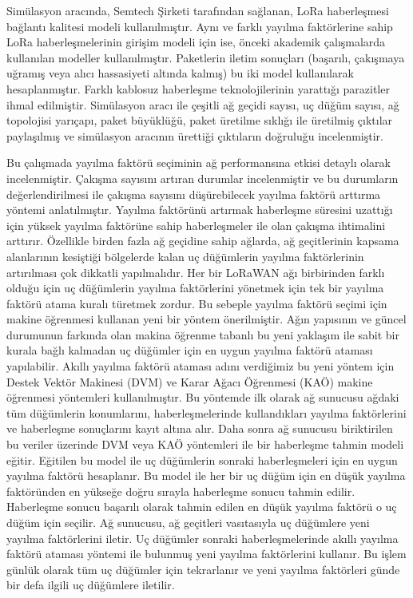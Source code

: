 Simülasyon aracında, Semtech Şirketi tarafından sağlanan, LoRa haberleşmesi bağlantı kalitesi modeli kullanılmıştır. Aynı ve farklı yayılma faktörlerine sahip LoRa haberleşmelerinin girişim modeli için ise, önceki akademik çalışmalarda kullanılan modeller kullanılmıştır. Paketlerin iletim sonuçları (başarılı, çakışmaya uğramış veya alıcı hassasiyeti altında kalmış) bu iki model kullanılarak hesaplanmıştır. Farklı kablosuz haberleşme teknolojilerinin yarattığı parazitler ihmal edilmiştir. Simülasyon aracı ile çeşitli ağ geçidi sayısı, uç düğüm sayısı, ağ topolojisi yarıçapı, paket büyüklüğü, paket üretilme sıklığı ile üretilmiş çıktılar paylaşılmış ve simülasyon aracının ürettiği çıktıların doğruluğu incelenmiştir.

Bu çalışmada yayılma faktörü seçiminin ağ performansına etkisi detaylı olarak incelenmiştir. Çakışma sayısını artıran durumlar incelenmiştir ve bu durumların değerlendirilmesi ile çakışma sayısını düşürebilecek yayılma faktörü arttırma yöntemi anlatılmıştır. Yayılma faktörünü artırmak haberleşme süresini uzattığı için yüksek yayılma faktörüne sahip haberleşmeler ile olan çakışma ihtimalini arttırır. Özellikle birden fazla ağ geçidine sahip ağlarda, ağ geçitlerinin kapsama alanlarının kesiştiği bölgelerde kalan uç düğümlerin yayılma faktörlerinin artırılması çok dikkatli yapılmalıdır. Her bir LoRaWAN ağı birbirinden farklı olduğu için uç düğümlerin yayılma faktörlerini yönetmek için tek bir yayılma faktörü atama kuralı türetmek zordur. Bu sebeple yayılma faktörü seçimi için makine öğrenmesi kullanan yeni bir yöntem önerilmiştir. Ağın yapısının ve güncel durumunun farkında olan makina öğrenme tabanlı bu yeni yaklaşım ile sabit bir kurala bağlı kalmadan uç düğümler için en uygun yayılma faktörü ataması yapılabilir. Akıllı yayılma faktörü ataması adını verdiğimiz bu yeni yöntem için Destek Vektör Makinesi (DVM) ve Karar Ağacı Öğrenmesi (KAÖ) makine öğrenmesi yöntemleri kullanılmıştır. Bu yöntemde ilk olarak ağ sunucusu ağdaki tüm düğümlerin konumlarını, haberleşmelerinde kullandıkları yayılma faktörlerini ve haberleşme sonuçlarını kayıt altına alır. Daha sonra ağ sunucusu biriktirilen bu veriler üzerinde DVM veya KAÖ yöntemleri ile bir haberleşme tahmin modeli eğitir. Eğitilen bu model ile uç düğümlerin sonraki haberleşmeleri için en uygun yayılma faktörü hesaplanır. Bu model ile her bir uç düğüm için en düşük yayılma faktöründen en yükseğe doğru sırayla haberleşme sonucu tahmin edilir. Haberleşme sonucu başarılı olarak tahmin edilen en düşük yayılma faktörü o uç düğüm için seçilir. Ağ sunucusu, ağ geçitleri vasıtasıyla uç düğümlere yeni yayılma faktörlerini iletir. Uç düğümler sonraki haberleşmelerinde akıllı yayılma faktörü ataması yöntemi ile bulunmuş yeni yayılma faktörlerini kullanır. Bu işlem günlük olarak tüm uç düğümler için tekrarlanır ve yeni yayılma faktörleri günde bir defa ilgili uç düğümlere iletilir.

